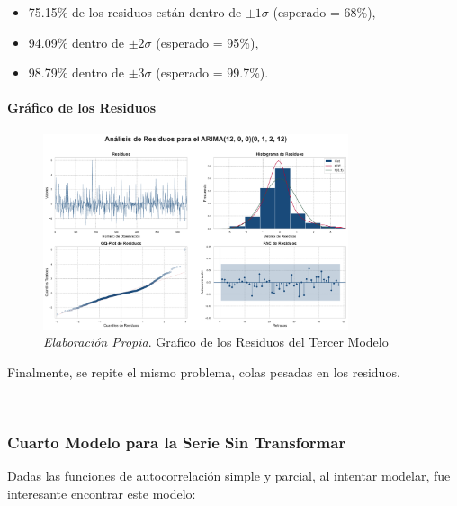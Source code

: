 \documentclass[12pt,letterpaper]{article}   %
\begin{document}
\begin{itemize}
    \item 75.15\% de los residuos están dentro de $\pm1\sigma$ (esperado = 68\%),
    \item 94.09\% dentro de $\pm2\sigma$ (esperado = 95\%),
    \item 98.79\% dentro de $\pm3\sigma$ (esperado = 99.7\%).
\end{itemize}





\paragraph{Gráfico de los Residuos}
\begin{figure}[ht]
    \centering
    \includegraphics[width=0.8\textwidth]{imagenes/04-03-analisis-de-residuos-m3.pdf}
    \caption{\textit{Elaboración Propia}. Grafico de los Residuos del Tercer Modelo}
\end{figure}

Finalmente, se repite el mismo problema, colas pesadas en los residuos.




\newpage
$\quad$
\newpage
\subsubsection{Cuarto Modelo para la Serie Sin Transformar}

Dadas las funciones de autocorrelación simple y parcial, al intentar modelar, fue interesante encontrar este modelo:
\end{document}
